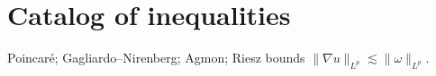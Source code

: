 \section{Catalog of inequalities}\label{app:ineq}
Poincar\'e; Gagliardo--Nirenberg; Agmon; Riesz bounds $\|\nabla u\|_{L^p}\lesssim \|\omega\|_{L^p}$.
